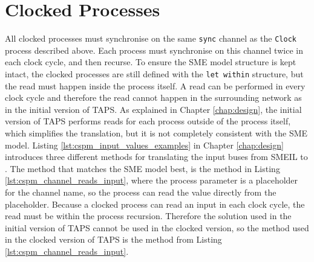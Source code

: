 \section{Clocked Processes}
All clocked processes must synchronise on the same \texttt{sync} channel as the \texttt{Clock} process described above. Each process must synchronise on this channel twice in each clock cycle, and then recurse. To ensure the SME model structure is kept intact, the clocked processes are still defined with the \texttt{let within} structure, but the read must happen inside the process itself. A read can be performed in every clock cycle and therefore the read cannot happen in the surrounding network as in the initial version of TAPS.
As explained in Chapter \ref{chap:design}, the initial version of TAPS performs reads for each process outside of the process itself, which simplifies the translation, but it is not completely consistent with the SME model. Listing \ref{lst:cspm_input_values_examples} in Chapter \ref{chap:design} introduces three different methods for translating the input buses from SMEIL to \cspm{}. The method that matches the SME model best, is the method in Listing \ref{lst:cspm_channel_reads_input}, where the process parameter is a placeholder for the channel name, so the process can read the value directly from the placeholder. Because a clocked process can read an input in each clock cycle, the read must be within the process recursion. Therefore the solution used in the initial version of TAPS cannot be used in the clocked version, so the method used in the clocked version of TAPS is the method from Listing \ref{lst:cspm_channel_reads_input}.\\

